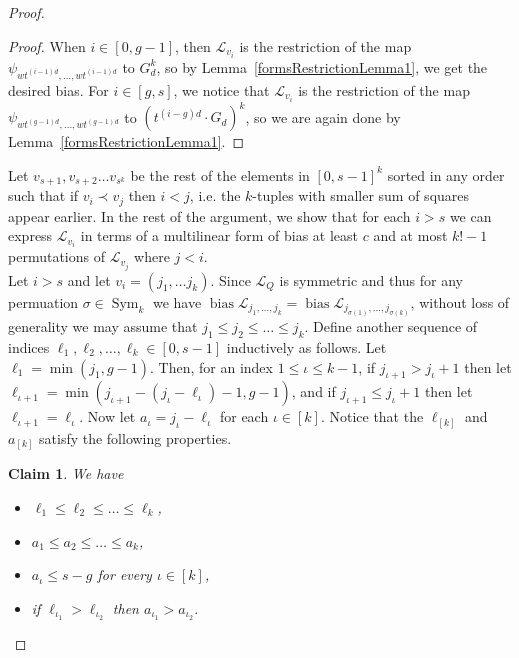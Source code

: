 \documentclass[a4paper,11pt]{article}
\newtheorem{claim}[theorem]{Claim}
\theoremstyle{definition}
\newcommand{\on}[1]{
	\operatorname{#1}
}
\begin{document}
\begin{proof}
    \begin{proof}
        When $i \in [0, g-1]$, then $\mathcal{L}_{v_i}$ is the restriction of the map $\psi_{wt^{(i-1)d}, \dots, wt^{(i-1)d}}$ to $G_d^k$, so by Lemma~\ref{formsRestrictionLemma1}, we get the desired bias. For $i \in [g, s]$, we notice that $\mathcal{L}_{v_i}$ is the restriction of the map $\psi_{wt^{(g-1)d}, \dots, wt^{(g-1)d}}$ to $(t^{(i - g)d}\cdot G_d)^k$, so we are again done by Lemma~\ref{formsRestrictionLemma1}.
    \end{proof}
    
    Let $v_{s+1},v_{s+2}\ldots v_{s^k}$ be the rest of the elements in $[0,s-1]^k$ sorted in any order  such that if $v_i \prec v_j$ then $i < j$, i.e. the $k$-tuples with smaller sum of squares appear earlier. In the rest of the argument, we show that for each $i > s$ we can express $\mathcal{L}_{v_i}$ in terms of a multilinear form of bias at least $c$ and at most $k!-1$ permutations of $\mathcal{L}_{v_j}$ where $j < i$.\\

Let $i > s$ and let $v_i=(j_1,\ldots j_k)$. Since $\mathcal{L}_Q$ is symmetric and thus for any permuation $\sigma \in \on{Sym}_k$ we have $\on{bias} \mathcal{L}_{j_1, \dots, j_k} = \on{bias} \mathcal{L}_{j_{\sigma(1)}, \dots, j_{\sigma(k)}}$, without loss of generality we may assume that $j_1\le j_2\le \ldots \le j_k$. Define another sequence of indices $\ell_1, \ell_2,\ldots ,\ell_k \in [0,s-1]$ inductively as follows. Let $\ell_1 = \min(j_1,g-1)$. Then, for an index $1\leq \iota \leq k-1$, if $j_{\iota + 1} > j_\iota + 1$ then let $\ell_{\iota+1} = \min (j_{\iota+1}-(j_\iota - \ell_\iota) - 1, g-1)$, and if $j_{\iota+1} \le j_\iota + 1$ then let $\ell_{\iota+1}= \ell_\iota$. Now let $a_\iota = j_\iota-\ell_\iota$ for each $\iota \in [k]$. Notice that the $\ell_{[k]}$ and $a_{[k]}$ satisfy the following properties.

\begin{claim}\label{aellpropsclaim} We have
\begin{itemize}
    \item[\textbf{(i)}] $\ell_1 \le \ell_2\le \ldots \le \ell_k$,
    \item[\textbf{(ii)}] $a_1 \le a_2\le \ldots \le a_k$,
    \item[\textbf{(iii)}] $a_\iota \leq s - g$ for every $\iota \in [k]$,
    \item[\textbf{(iv)}] if $\ell_{\iota_1} > \ell_{\iota_2}$ then $a_{\iota_1} > a_{\iota_2}$.
\end{itemize}
\end{claim}


\end{proof}
\end{document}
